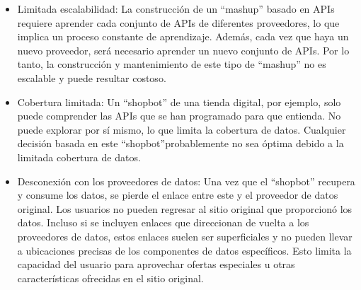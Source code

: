 \begin{itemize}
  \item Limitada escalabilidad: La construcción de un ``mashup'' basado en APIs requiere aprender cada conjunto de APIs de diferentes proveedores, lo que implica un proceso constante de aprendizaje. Además, cada vez que haya un nuevo proveedor, será necesario aprender un nuevo conjunto de APIs. Por lo tanto, la construcción y mantenimiento de este tipo de ``mashup'' no es escalable y puede resultar costoso.
  \item Cobertura limitada: Un ``shopbot'' de una tienda digital, por ejemplo, solo puede comprender las APIs que se han programado para que entienda. No puede explorar por sí mismo, lo que limita la cobertura de datos. Cualquier decisión basada en este ``shopbot''probablemente no sea óptima debido a la limitada cobertura de datos.
  \item Desconexión con los proveedores de datos: Una vez que el ``shopbot'' recupera y consume los datos, se pierde el enlace entre este y el proveedor de datos original. Los usuarios no pueden regresar al sitio original que proporcionó los datos. Incluso si se incluyen enlaces que direccionan de vuelta a los proveedores de datos, estos enlaces suelen ser superficiales y no pueden llevar a ubicaciones precisas de los componentes de datos específicos. Esto limita la capacidad del usuario para aprovechar ofertas especiales u otras características ofrecidas en el sitio original.
\end{itemize}

